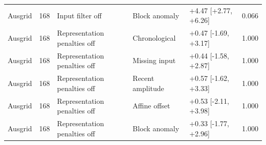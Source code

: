 {\begin{longtable}{lllp{2.5cm}p{4.1cm}r}
Ausgrid & 168 & Input filter off & Block anomaly & +4.47 [+2.77, +6.26] & 0.066 \\
Ausgrid & 168 & Representation penalties off & Chronological & +0.47 [-1.69, +3.17] & 1.000 \\
Ausgrid & 168 & Representation penalties off & Missing input & +0.44 [-1.58, +2.87] & 1.000 \\
Ausgrid & 168 & Representation penalties off & Recent amplitude & +0.57 [-1.62, +3.33] & 1.000 \\
Ausgrid & 168 & Representation penalties off & Affine offset & +0.53 [-2.11, +3.98] & 1.000 \\
Ausgrid & 168 & Representation penalties off & Block anomaly & +0.33 [-1.77, +2.96] & 1.000 \\
\bottomrule
\end{longtable}
}
